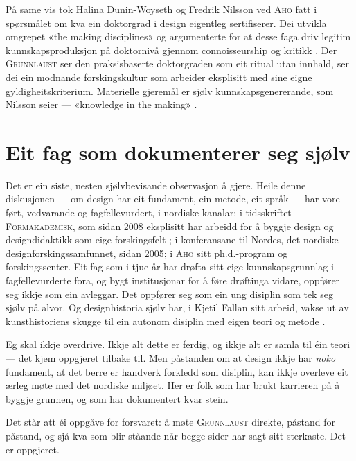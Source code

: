 På same vis tok Halina Dunin-Woyseth og Fredrik Nilsson ved \textsc{Aho} fatt i spørsmålet om kva ein doktorgrad i design eigentleg sertifiserer. Dei utvikla omgrepet «the making disciplines» og argumenterte for at desse faga driv legitim kunnskapsproduksjon på doktornivå gjennom connoisseurship og kritikk \autocite{duninwoyseth2011making,nilsson2012doctorateness}. Der \textsc{Grunnlaust} ser den praksisbaserte doktorgraden som eit ritual utan innhald, ser dei ein modnande forskingskultur som arbeider eksplisitt med sine eigne gyldigheitskriterium. Materielle gjeremål er sjølv kunnskapsgenererande, som Nilsson seier — «knowledge in the making» \autocite{nilsson2013knowledge}.

\section{Eit fag som dokumenterer seg sjølv}

Det er ein siste, nesten sjølvbevisande observasjon å gjere. Heile denne diskusjonen — om design har eit fundament, ein metode, eit språk — har vore ført, vedvarande og fagfellevurdert, i nordiske kanalar: i tidsskriftet \textsc{Formakademisk}, som sidan 2008 eksplisitt har arbeidd for å byggje design og designdidaktikk som eige forskingsfelt \autocite{reitan2012formakademisk}; i konferansane til Nordes, det nordiske designforskingssamfunnet, sidan 2005; i \textsc{Aho} sitt ph.d.-program og forskingssenter. Eit fag som i tjue år har drøfta sitt eige kunnskapsgrunnlag i fagfellevurderte fora, og bygt institusjonar for å føre drøftinga vidare, oppfører seg ikkje som ein avleggar. Det oppfører seg som ein ung disiplin som tek seg sjølv på alvor. Og designhistoria sjølv har, i Kjetil Fallan sitt arbeid, vakse ut av kunsthistoriens skugge til ein autonom disiplin med eigen teori og metode \autocite{fallan2010,fallan2016designing}.

Eg skal ikkje overdrive. Ikkje alt dette er ferdig, og ikkje alt er samla til éin teori — det kjem oppgjeret tilbake til. Men påstanden om at design ikkje har \emph{noko} fundament, at det berre er handverk forkledd som disiplin, kan ikkje overleve eit ærleg møte med det nordiske miljøet. Her er folk som har brukt karrieren på å byggje grunnen, og som har dokumentert kvar stein.

\vignett

Det står att éi oppgåve for forsvaret: å møte \textsc{Grunnlaust} direkte, påstand for påstand, og sjå kva som blir ståande når begge sider har sagt sitt sterkaste. Det er oppgjeret.

